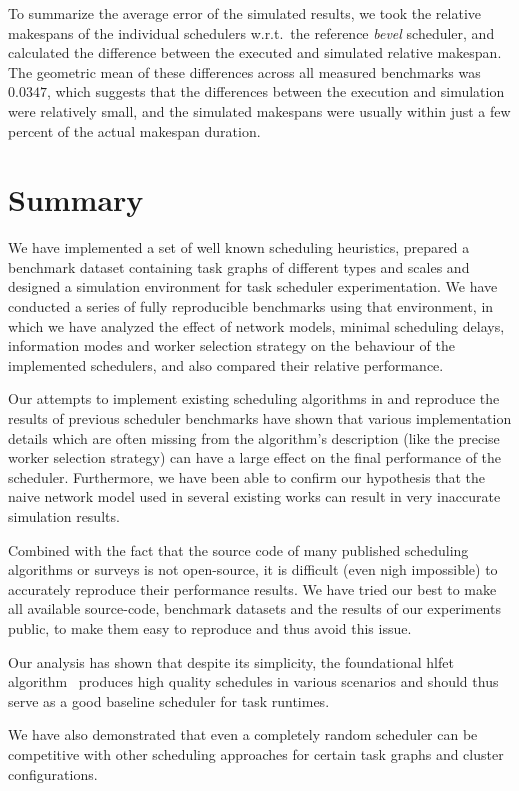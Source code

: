 To summarize the average error of the simulated results, we took the relative makespans of the
individual schedulers w.r.t.\ the reference \emph{bevel} scheduler, and calculated the
difference between the executed and simulated relative makespan. The geometric mean of these
differences across all measured benchmarks was $0.0347$, which suggests that the
differences between the execution and simulation were relatively small, and the simulated makespans
were usually within just a few percent of the actual makespan duration.

\section*{Summary}
We have implemented a set of well known scheduling heuristics, prepared a benchmark dataset
containing task graphs of different types and scales and designed a simulation environment for task
scheduler experimentation. We have conducted a series of fully reproducible benchmarks using that
environment, in which we have analyzed the effect of network models, minimal scheduling delays,
information modes and worker selection strategy on the behaviour of the implemented schedulers, and
also compared their relative performance.

Our attempts to implement existing scheduling algorithms in \estee{} and reproduce
the results of previous scheduler benchmarks have shown that various implementation details which
are often missing from the algorithm's description (like the precise worker selection strategy) can
have a large effect on the final performance of the scheduler. Furthermore, we have been able to
confirm our hypothesis that the naive network model used in several existing works can result in
very inaccurate simulation results.

Combined with the fact that the source code of many published scheduling algorithms or surveys is
not open-source, it is difficult (even nigh impossible) to accurately reproduce their performance
results. We have tried our best to make all available source-code, benchmark datasets and the
results of our experiments public, to make them easy to reproduce and thus avoid this issue.

Our analysis has shown that despite its simplicity, the foundational \gls{hlfet}
algorithm~\cite{hlfet1974} produces high quality schedules in various scenarios and should
thus serve as a good baseline scheduler for task runtimes.

We have also demonstrated that even a completely random scheduler can be competitive with other
scheduling approaches for certain task graphs and cluster configurations.

